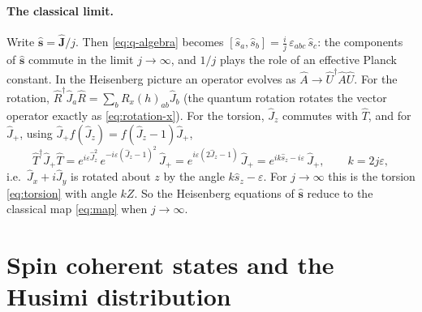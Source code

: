 \documentclass[11pt,a4paper]{article}
\newcommand{\vJ}{\bm{J}}
\begin{document}
\paragraph{The classical limit.} Write $\hat{\bm s} = \hat{\vJ}/j$. Then \eqref{eq:q-algebra} becomes $[\hat s_a, \hat
s_b] = \frac{i}{j}\,\varepsilon_{abc}\,\hat s_c$: the components of $\hat{\bm s}$ commute in the limit $j\to\infty$, and
$1/j$ plays the role of an effective Planck constant. In the Heisenberg picture an operator evolves as $\hat A \to
\hat U^\dagger\hat A\hat U$. For the rotation, $\hat R^\dagger\hat J_a\hat R = \sum_b R_x(h)_{ab}\hat J_b$ (the quantum
rotation rotates the vector operator exactly as \eqref{eq:rotation-x}). For the torsion, $\hat J_z$ commutes with $\hat T$,
and for $\hat J_+$, using $\hat J_+ f(\hat J_z) = f(\hat J_z - 1)\hat J_+$,
\begin{equation*}
  \hat T^\dagger\hat J_+\hat T = e^{i\varepsilon\hat J_z^2}\,e^{-i\varepsilon(\hat J_z-1)^2}\,\hat J_+
  = e^{i\varepsilon(2\hat J_z - 1)}\,\hat J_+ = e^{ik\hat s_z - i\varepsilon}\,\hat J_+ , \qquad k = 2j\varepsilon ,
\end{equation*}
i.e.\ $\hat J_x + i\hat J_y$ is rotated about $z$ by the angle $k\hat s_z - \varepsilon$. For $j\to\infty$ this is the
torsion \eqref{eq:torsion} with angle $kZ$. So the Heisenberg equations of $\hat{\bm s}$ reduce to the classical map
\eqref{eq:map} when $j\to\infty$.

\section{Spin coherent states and the Husimi distribution}\label{sec:coherent}
\end{document}

